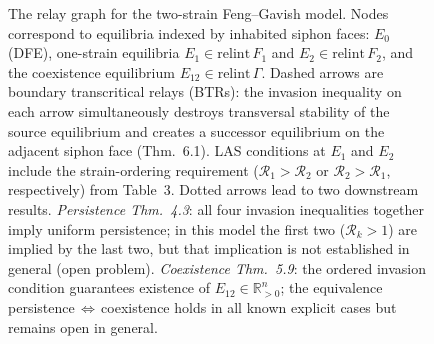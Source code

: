 \begin{figure}[H]
{
 }
\caption{%
The relay graph for the two-strain Feng--Gavish model.
Nodes correspond to equilibria indexed by inhabited siphon faces:
$E_0$ (DFE), one-strain equilibria $E_1\in\mathrm{relint}\,F_1$
and $E_2\in\mathrm{relint}\,F_2$, and the coexistence equilibrium
$E_{12}\in\mathrm{relint}\,\Gamma$.
Dashed arrows are boundary transcritical relays (BTRs): the invasion
inequality on each arrow simultaneously destroys transversal stability
of the source equilibrium and creates a successor equilibrium on the
adjacent siphon face (Thm.~6.1).
LAS conditions at $E_1$ and $E_2$ include the strain-ordering
requirement ($\mathcal{R}_1>\mathcal{R}_2$ or $\mathcal{R}_2>\mathcal{R}_1$,
respectively) from Table~3.
Dotted arrows lead to two downstream results.
\emph{Persistence Thm.~4.3}: all four invasion inequalities together
imply uniform persistence; in this model the first two
($\mathcal{R}_k>1$) are implied by the last two, but that
implication is not established in general (open problem).
\emph{Coexistence Thm.~5.9}: the ordered invasion condition
guarantees existence of $E_{12}\in\mathbb{R}^n_{>0}$; the
equivalence persistence\,$\Leftrightarrow$\,coexistence holds in
all known explicit cases but remains open in general.%
}
\label{fig:relay-graph}
\end{figure}






\iffalse










